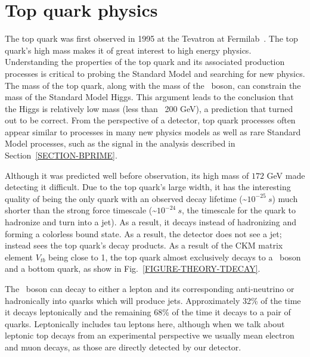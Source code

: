 \section{Top quark physics}
\label{THEORY-TOPQUARK}

The top quark was first observed in 1995 at the Tevatron at Fermilab~\cite{Top-CDF,Top-D0}. The top quark's high mass makes it of great interest to high energy physics. Understanding the properties of the top quark and its associated production processes is critical to probing the Standard Model and searching for new physics. The mass of the top quark, along with the mass of the \Wboson\ boson, can constrain the mass of the Standard Model Higgs. This argument leads to the conclusion that the Higgs is relatively low mass (less than ~200 GeV), a prediction that turned out to be correct. From the perspective of a detector, top quark processes often appear similar to processes in many new physics models as well as rare Standard Model processes, such as the signal in the analysis described in Section~\ref{SECTION-BPRIME}.

Although it was predicted well before observation, its high mass of $172$ GeV made detecting it difficult. Due to the top quark's large width, it has the interesting quality of being the only quark with an observed decay lifetime (\textasciitilde $10^{-25}\ s$) much shorter than the strong force timescale (\textasciitilde $10^{-24}\ s$, the timescale for the quark to hadronize and turn into a jet). As a result, it decays instead of hadronizing and forming a colorless bound state. As a result, the detector does not see a jet; instead sees the top quark's decay products. As a result of the CKM matrix element $V_{tb}$ being close to 1, the top quark almost exclusively decays to a \Wboson\ boson and a bottom quark, as show in Fig.~\ref{FIGURE-THEORY-TDECAY}.


The \Wboson\ boson can decay to either a lepton and its corresponding anti-neutrino or hadronically into quarks which will produce jets. Approximately 32\% of the time it decays leptonically and the remaining 68\% of the time it decays to a pair of quarks. Leptonically includes tau leptons here, although when we talk about leptonic top decays from an experimental perspective we usually mean electron and muon decays, as those are directly detected by our detector.


